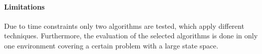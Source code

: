 \paragraph{Limitations}
\label{sec:limitations}

Due to time constraints only two algorithms are tested, which apply different techniques. Furthermore, the evaluation of the selected algorithms is done in only one environment covering a certain problem with a large state space. 

